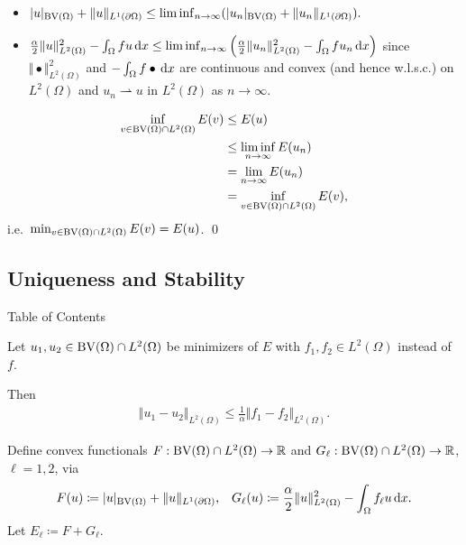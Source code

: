 \begin{frame}

  \begin{itemize}[label=$\bullet$]
    \item 
      $
    |u|_{\textup{BV}(\Omega)} +\Vert u\Vert_{L^1(\partial\Omega)}
    \leq \liminf_{n\to\infty} (|u_n|_{\textup{BV}(\Omega)} +
    \Vert u_n\Vert_{L^1(\partial\Omega)}).
    $
  \pause
  \item
  $
    \frac{\alpha}{2}\Vert u\Vert^2_{L^2(\Omega)}-\int_\Omega fu\,\mathrm{d}x
    \leq \liminf_{n\to\infty}
    \left(\frac{\alpha}{2}\Vert u_n\Vert_{L^2(\Omega)}^2
    -\int_\Omega fu_n\,\mathrm{d}x\right)
    $
  since 
  $\Vert\bullet\Vert_{L^2(\Omega)}^2$ and $-\int_\Omega
  f\bullet\,\mathrm{d}x$ are continuous and convex (and hence w.l.s.c.) on $L^2(\Omega)$
  and $u_n \rightharpoonup u$ in $L^2(\Omega)$ as $n\to\infty$.
  \end{itemize}
  \pause
  
  \begin{align*}
    \inf_{v\in\textup{BV}(\Omega)\cap L^2(\Omega)}E(v)
    &\leq
    E(u)\\
    &\leq\liminf_{n\rightarrow\infty} E(u_n) \\
    &=
    \lim_{n\rightarrow\infty}E(u_n) \\
    &= \inf_{v\in\textup{BV}(\Omega)\cap
    L^2(\Omega)}E(v),
  \end{align*}
  i.e.\ $\min_{v\in\textup{BV}(\Omega)\cap L^2(\Omega)} E(v) = E(u)$. \qed
  
\end{frame}

\subsection{Uniqueness and Stability}
\begin{frame}{Table of Contents}
\end{frame}

\begin{frame}
  \begin{block}{}
  Let $u_1,u_2\in \textup{BV}(\Omega)\cap L^2(\Omega)$ be minimizers
  of $E$ with $f_1,f_2\in L^2(\Omega)$ instead of $f$.

  Then
  \begin{align*}
    \Vert u_1 - u_2\Vert_{L^2(\Omega)} 
    \leq\frac{1}{\alpha}\Vert f_1-f_2\Vert_{L^2(\Omega)}.
  \end{align*}
  \end{block}
  
  \pause
  Define convex functionals $F:\textup{BV}(\Omega)\cap L^2(\Omega)\to \mathbb{R}$
  and
  $G_\ell:\textup{BV}(\Omega)\cap L^2(\Omega)\to \mathbb{R}$, $\ell=1,2$, via
  \begin{align*}
    F(u) &\coloneqq |u|_{\textup{BV}(\Omega)} + \Vert u \Vert_{L^1(\partial\Omega)},&
    G_\ell(u)\coloneqq \frac{\alpha}{2}\Vert u\Vert_{L^2(\Omega)}^2 -
    \int_\Omega f_\ell u\,\mathrm{d}x.
  \end{align*}
  Let $E_\ell\coloneqq F+G_\ell$.
\end{frame}

